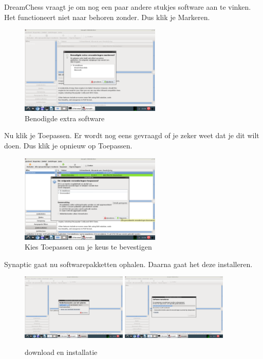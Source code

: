 \documentclass[12pt,a4paper]{article}
\begin{document}
\clearpage

DreamChess vraagt je om nog een paar andere stukjes software aan te vinken. Het functioneert niet naar behoren zonder. Dus klik je Markeren.

\begin{figure} [H]
\centering
\includegraphics[width=0.6\textwidth]{plaatje08}
\caption{Benodigde extra software}
\label{plaatje08}
\end{figure}

Nu klik je Toepassen. Er wordt nog eens gevraagd of je zeker weet dat je dit wilt doen. Dus klik je opnieuw op Toepassen. 

\begin{figure} [H]
\centering
\includegraphics[width=0.6\textwidth]{plaatje10}
\caption{Kies Toepassen om je keus te bevestigen}
\label{plaatje10}
\end{figure}

Synaptic gaat nu softwarepakketten ophalen. Daarna gaat het deze installeren.

\begin{figure} [H]
\centering
\includegraphics[width=0.45\textwidth]{plaatje11}
\includegraphics[width=0.45\textwidth]{plaatje12}
\caption{download en installatie}
\label{plaatje11}
\end{figure}
\end{document}

